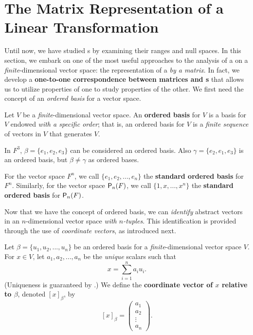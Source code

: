 \section{The Matrix Representation of a Linear Transformation} \label{sec 2.2}

Until now, we have studied \LTRAN{}s by examining their ranges and null spaces.
In this section, we embark on one of the most useful approaches to the analysis of a \LTRAN{} on a \emph{finite}-dimensional vector space:
the representation of a \LTRAN{} \emph{by a matrix}.
In fact, we develop a \textbf{one-to-one correspondence between matrices and \LTRAN{}s} that allows us to utilize properties of one to study properties of the other.
We first need the concept of an \emph{ordered basis} for a vector space.

\begin{definition} \label{def 2.4}
Let \(V\) be a \emph{finite}-dimensional vector space.
An \textbf{ordered basis} for \(V\) is a basis for \(V\) endowed \emph{with a specific order};
that is, an ordered basis for \(V\) is a \emph{finite sequence} of \LID{} vectors in \(V\) that generates \(V\).
\end{definition}

\begin{example} \label{example 2.2.1}
In \(F^3\), \(\beta = \{ e_1, e_2, e_3 \}\) can be considered an ordered basis.
Also \(\gamma = \{ e_2, e_1, e_3 \}\) is an ordered basis, but \(\beta \ne \gamma\) as ordered bases.
\end{example}

\begin{additional definition} \label{adef 2.4}
For the vector space \(F^n\), we call \(\{ e_1, e_2, ..., e_n \}\) the \textbf{standard ordered basis} for \(F^n\).
Similarly, for the vector space \(\textsf{P}_n(F)\), we call \(\{ 1, x, ..., x^n \}\) the \textbf{standard ordered basis} for \(\textsf{P}_n(F)\).
\end{additional definition}

\begin{remark} \label{remark 2.2.1}
Now that we have the concept of ordered basis, we can \emph{identify} abstract vectors in an \(n\)-dimensional vector space \emph{with \(n\)-tuples}.
This identification is provided through the use of \emph{coordinate vectors}, as introduced next.
\end{remark}

\begin{definition} \label{def 2.5}
Let \(\beta = \{ u_1, u_2, ..., u_n \}\) be an ordered basis for a \emph{finite}-dimensional vector space \(V\).
For \(x \in V\), let \(a_1, a_2, ..., a_n\) be the \emph{unique} scalars such that
\[
    x = \sum_{i = 1}^n a_i u_i.
\]
(Uniqueness is guaranteed by .)
We define the \textbf{coordinate vector of \(x\) relative to \(\beta\)}, denoted \([x]_{\beta}\), by
\[
    [x]_{\beta} = \begin{pmatrix} a_1 \\ a_2 \\ \vdots \\ a_n \end{pmatrix}.
\]
\end{definition}

